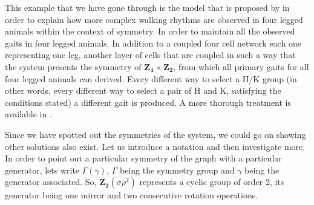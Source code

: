This example that we have gone through is the model that is proposed by \citet{Golubitsky199856} in order to explain how more complex walking rhythms are observed in four legged animals within the context of symmetry. In order to maintain all the observed gaits in four legged animals. In addition to a coupled four cell network each one representing one leg, another layer of cells that are coupled in such a way that the system presents the symmetry of $\mathbf{Z_4} \times \mathbf{Z_2}$, from which all primary gaits for all four legged animals can derived. Every different way to select a H/K group (in other words, every different way to select a pair of H and K, satisfying the conditions stated) a different gait is produced. A more thorough treatment is available in \citet{golubitsky_symmetry_2003, stewart_symmetry_2003}.

Since we have spotted out the symmetries of the system, we could go on showing other solutions also exist. Let us introduce a notation and then investigate more. In order to point out a particular symmetry of the graph with a particular generator, lets write $\Gamma ( \gamma )$, $\Gamma $ being the symmetry group and $\gamma $ being the generator associated. So, $\mathbf{Z_2}(\sigma \rho^2)$ represents a cyclic group of order 2, its generator being one mirror and two consecutive rotation operations. 


